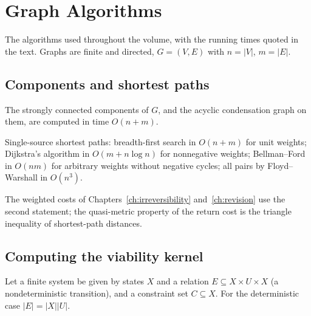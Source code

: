 \chapter{Graph Algorithms}\label{app:graphs}

The algorithms used throughout the volume, with the running times quoted in the text. Graphs are finite and directed, $G=(V,E)$ with $n=|V|$, $m=|E|$.

\section{Components and shortest paths}

\begin{established}\label{c:scc}
The strongly connected components of $G$, and the acyclic condensation graph on them, are computed in time $O(n+m)$.
\end{established}

\begin{established}\label{c:sp}
Single-source shortest paths: breadth-first search in $O(n+m)$ for unit weights; Dijkstra's algorithm in $O(m+n\log n)$ for nonnegative weights; Bellman--Ford in $O(nm)$ for arbitrary weights without negative cycles; all pairs by Floyd--Warshall in $O(n^3)$.
\end{established}

The weighted costs of Chapters~\ref{ch:irreversibility} and~\ref{ch:revision} use the second statement; the quasi-metric property of the return cost is the triangle inequality of shortest-path distances.

\section{Computing the viability kernel}

Let a finite system be given by states $X$ and a relation $E\subseteq X\times U\times X$ (a nondeterministic transition), and a constraint set $C\subseteq X$. For the deterministic case $|E|=|X||U|$.

